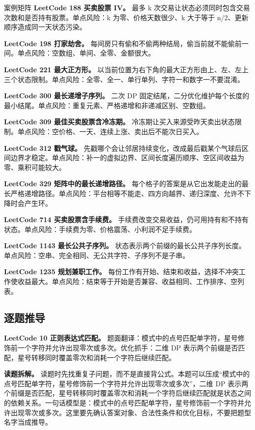 \begin{principlebox}{案例矩阵}
\textbf{LeetCode 188 买卖股票 IV。}
最多 k 次交易让状态必须同时包含交易次数和是否持有股票。单点风险：k 为零、价格天数很少、k 大于等于 n/2、更新顺序造成同一天状态污染。

\textbf{LeetCode 198 打家劫舍。}
每间房只有偷和不偷两种结局，偷当前就不能偷前一间。单点风险：空数组、单间、全零、金额很大。

\textbf{LeetCode 221 最大正方形。}
以当前位置为右下角的最大正方形由上、左、左上三个状态限制。单点风险：全零、全一、单行单列、字符一和数字一不要混淆。

\textbf{LeetCode 300 最长递增子序列。}
二次 DP 固定结尾，二分优化维护每个长度的最小结尾。单点风险：重复元素、严格递增和非递减区别、空数组。

\textbf{LeetCode 309 最佳买卖股票含冷冻期。}
冷冻期让买入来源受昨天卖出状态限制。单点风险：空价格、一天、连续上涨、卖出后不能次日买入。

\textbf{LeetCode 312 戳气球。}
先戳哪个会让邻居持续变化，改成最后戳某个气球后区间边界才稳定。单点风险：补一的虚拟边界、区间长度遍历顺序、空区间收益为零、乘积可能较大。

\textbf{LeetCode 329 矩阵中的最长递增路径。}
每个格子的答案是从它出发能走出的最长严格递增路径。单点风险：平台相等不能走、四方向越界、递归深度、允许不下降时会产生环。

\textbf{LeetCode 714 买卖股票含手续费。}
手续费改变交易收益，仍可用持有和不持有状态。单点风险：手续费为零、价格震荡、小利润不足手续费。

\textbf{LeetCode 1143 最长公共子序列。}
状态表示两个前缀的最长公共子序列长度。单点风险：空串、完全相同、无公共字符、子序列不是子串。

\textbf{LeetCode 1235 规划兼职工作。}
每份工作有开始、结束和收益，选择不冲突工作使收益最大。单点风险：结束等于开始是否兼容、收益相同、工作排序、空列表。

\end{principlebox}

\subsection{逐题推导}

\noindent\textbf{LeetCode 10 正则表达式匹配。} 题面翻译：模式中的点号匹配单字符，星号修饰前一个字符并允许出现零次或多次。优化抓手：二维 DP 表示两个前缀是否匹配，星号转移同时覆盖零次和消耗一个字符后继续匹配。

\textbf{读题拆解。} 读题时先找重复子问题，而不是直接背公式。本题可以压成“模式中的点号匹配单字符，星号修饰前一个字符并允许出现零次或多次”，二维 DP 表示两个前缀是否匹配，星号转移同时覆盖零次和消耗一个字符后继续匹配就是状态之间的依赖关系。一句话模型是：模式中的点号匹配单字符，星号修饰前一个字符并允许出现零次或多次。这里要先确认答案对象、合法性条件和优化目标，不要把题型名字当成推导。

